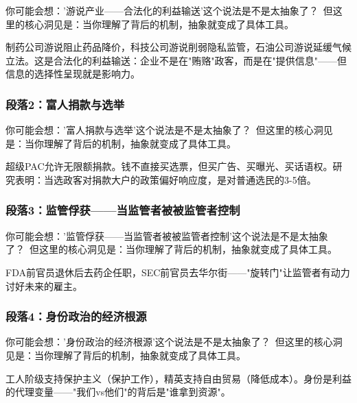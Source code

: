 \documentclass[a4paper,12pt]{book}
\newenvironment{motivation}{\begin{tcolorbox}[colback=gray!10,colframe=gray!60,title=\textit{本章动机},fonttitle=\bfseries,arc=0mm,leftrule=3mm]\small\itshape}{\end{tcolorbox}}
\begin{document}
\begin{motivation}
\begin{motivation}
\begin{motivation}
	\begin{tcolorbox}[colback=yellow!5, title=\textit{读者行为预测}]
		你可能会想：'游说产业——合法化的利益输送'这个说法是不是太抽象了？\ 但这里的核心洞见是：当你理解了背后的机制，抽象就变成了具体工具。
	\end{tcolorbox}

制药公司游说阻止药品降价，科技公司游说削弱隐私监管，石油公司游说延缓气候立法。这是合法化的利益输送：企业不是在"贿赂"政客，而是在"提供信息"——但信息的选择性呈现就是影响力。

	\subsubsection*{段落2：富人捐款与选举}

	\begin{tcolorbox}[colback=yellow!5, title=\textit{读者行为预测}]
		你可能会想：'富人捐款与选举'这个说法是不是太抽象了？\ 但这里的核心洞见是：当你理解了背后的机制，抽象就变成了具体工具。
	\end{tcolorbox}

超级PAC允许无限额捐款。钱不直接买选票，但买广告、买曝光、买话语权。研究表明：当选政客对捐款大户的政策偏好响应度，是对普通选民的3-5倍。

	\subsubsection*{段落3：监管俘获——当监管者被被监管者控制}

	\begin{tcolorbox}[colback=yellow!5, title=\textit{读者行为预测}]
		你可能会想：'监管俘获——当监管者被被监管者控制'这个说法是不是太抽象了？\ 但这里的核心洞见是：当你理解了背后的机制，抽象就变成了具体工具。
	\end{tcolorbox}

FDA前官员退休后去药企任职，SEC前官员去华尔街——"旋转门"让监管者有动力讨好未来的雇主。

	\subsubsection*{段落4：身份政治的经济根源}

	\begin{tcolorbox}[colback=yellow!5, title=\textit{读者行为预测}]
		你可能会想：'身份政治的经济根源'这个说法是不是太抽象了？\ 但这里的核心洞见是：当你理解了背后的机制，抽象就变成了具体工具。
	\end{tcolorbox}

工人阶级支持保护主义（保护工作），精英支持自由贸易（降低成本）。身份是利益的代理变量——"我们vs他们"的背后是"谁拿到资源"。


\end{motivation}
\end{motivation}
\end{motivation}
\end{document}
